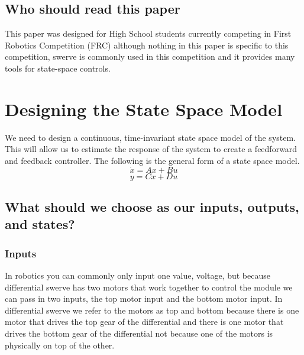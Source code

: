 \documentclass{scrartcl}
\begin{document}
\subsection{Who should read this paper}
This paper was designed for High School students currently competing in First Robotics Competition (FRC) although nothing in this paper is specific to this competition, swerve is commonly used in this competition and it provides many tools for state-space controls.

\newpage
\section{Designing the State Space Model}

We need to design a continuous, time-invariant state space model of the system. This will allow us to estimate the response of the system to create a feedforward and feedback controller. The following is the general form of a state space model.
\begin{equation} \label{state-change}
    \dot{x} = Ax + Bu
\end{equation}
\begin{equation} \label{output}
    y = Cx + Du
\end{equation}

\subsection*{What should we choose as our inputs, outputs, and states?}
\subsubsection*{Inputs}
In robotics you can commonly only input one value, voltage, but because differential swerve has two motors that work together to control the module we can pass in two inputs, the top motor input and the bottom motor input. In differential swerve we refer to the motors as top and bottom because there is one motor that drives the top gear of the differential and there is one motor that drives the bottom gear of the differential not because one of the motors is physically on top of the other.
\end{document}
